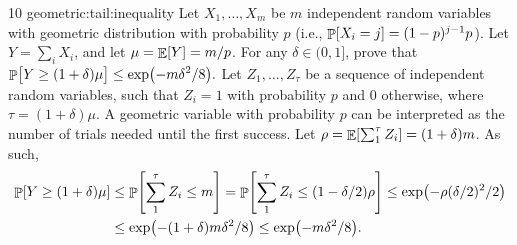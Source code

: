  {10}%
 {geometric:tail:inequality}{%
    Let $X_1, \ldots, X_m$ be $m$ independent random variables with geometric
    distribution with probability $p$ (i.e.,
    $\Prob{X_i = j} = (1-p)^{j-1} p$). Let $Y = \sum_{i} X_i$, and let
    $\mu = \mathop{\mathbb{E}}\!\left[ {Y} \right] = m/p$. For any $\delta \in (0,1]$, prove that
    \begin{math}
       \ds \Prob{\bigl. Y \geq (1+\delta) \mu \MakesBig }%
       \leq%
       \exp \pth[]{ - \nfrac{m \delta^2}{8}}.
   \end{math}%
}{%
   Let $Z_1, \ldots, Z_\tau$ be a sequence of independent random
   variables, such that $Z_i=1$ with probability $p$ and $0$
   otherwise, where $\tau = (1+\delta) \mu$. A geometric
   variable with probability $p$ can be interpreted as the number of
   trials needed until the first success. Let
   $\rho = \mathop{\mathbb{E}}\!\left[ {\sum_{1}^{\tau} Z_i} \right] = (1+\delta)m$.  As such,
   \begin{align*}
       \Prob{Y \geq (1+\delta) \mu }%
       &\leq %
       \Prob{\sum_{1}^{\tau} Z_i \leq m}%
       =%
       \Prob{\sum_{1}^{\tau} Z_i \leq (1-\delta/2)\rho }%
       \leq%
       \exp\pth{ - \rho (\delta/2)^2/ 2 }\\
       &\leq%
       \exp\pth{ - (1+\delta)m \delta^2/ 8 }%
       \leq%
       \exp\pth{ -m \delta^2/ 8 }.
   \end{align*}
}


\ChapterEnd{}


